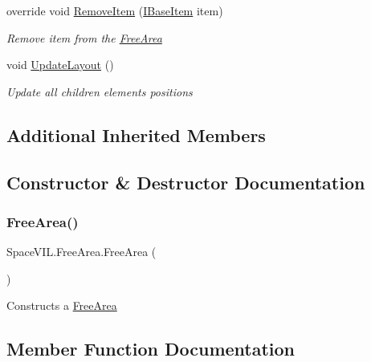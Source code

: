 \begin{DoxyCompactItemize}
override void \mbox{\hyperlink{class_space_v_i_l_1_1_free_area_ae9b39df00c0fa786b4072b8e49e3aacc}{Remove\+Item}} (\mbox{\hyperlink{interface_space_v_i_l_1_1_core_1_1_i_base_item}{I\+Base\+Item}} item)
\begin{DoxyCompactList}\small\item\em Remove item from the \mbox{\hyperlink{class_space_v_i_l_1_1_free_area}{Free\+Area}} \end{DoxyCompactList}\item 
void \mbox{\hyperlink{class_space_v_i_l_1_1_free_area_a88f3dc2645275f25f2fae769e7a1423a}{Update\+Layout}} ()
\begin{DoxyCompactList}\small\item\em Update all children elements positions \end{DoxyCompactList}\end{DoxyCompactItemize}
\subsection*{Additional Inherited Members}


\subsection{Constructor \& Destructor Documentation}
\mbox{\label{class_space_v_i_l_1_1_free_area_a66c2dcb40e9cacde8f342c20a5193d96}} 
\subsubsection{\texorpdfstring{Free\+Area()}{FreeArea()}}
{\footnotesize\ttfamily Space\+V\+I\+L.\+Free\+Area.\+Free\+Area (\begin{DoxyParamCaption}{ }\end{DoxyParamCaption})}



Constructs a \mbox{\hyperlink{class_space_v_i_l_1_1_free_area}{Free\+Area}} 



\subsection{Member Function Documentation}
\mbox{\label{class_space_v_i_l_1_1_free_area_af8b1aa9fc2390fb36a34b6bf4d1ef76a}} 
